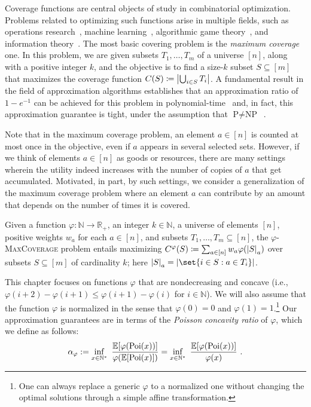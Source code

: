 Coverage functions are central objects of study in combinatorial optimization. Problems related to optimizing such functions arise in multiple fields, such as operations research~\cite{CFN77}, machine learning~\cite{FK14}, algorithmic game theory~\cite{DV15}, and information theory~\cite{BF18}. The most basic covering problem is the \emph{maximum coverage} one. In this problem, we are given subsets $T_1, \ldots, T_m$ of a universe $[n]$, along with a positive integer $k$, and the objective is to find a size-$k$ subset $S \subseteq [m]$ that maximizes the coverage function $C(S) \coloneqq  \abs{\bigcup_{i \in S} T_i}$. A fundamental result in the field of approximation algorithms establishes that an approximation ratio of $1-e^{-1}$ can be achieved for this problem in polynomial-time~\cite{Hochbaum96} and, in fact, this approximation guarantee is tight, under the assumption that $\textrm{P} \not= \textrm{NP}$~\cite{Feige98}.

Note that in the maximum coverage problem, an element $a \in [n]$ is counted at most once in the objective, even if $a$ appears in several selected sets. However, if we think of elements $a \in [n]$ as goods or resources, there are many settings wherein the utility indeed increases with the number of copies of $a$ that get accumulated. Motivated, in part, by such settings, we consider a generalization of the maximum coverage problem where an element $a$ can contribute by an amount that depends on the number of times it is covered. 

Given a function $\varphi: \mathbb{N} \rightarrow \mathbb{R}_+$, an integer $k \in \mathbb{N}$, a universe of elements $[n]$, positive weights $w_a$ for each $a \in [n]$, and  subsets $T_1,\ldots,T_m \subseteq [n]$, the $\varphi$-\textsc{MaxCoverage} problem entails maximizing $C^{\varphi}(S) \coloneqq \sum_{a \in [n]}w_a  \varphi(\abs{S}_a)$ over subsets $S \subseteq [m]$ of cardinality $k$; here $\abs{S}_a = \abs{\set{i \in S : a \in T_i}}$.

This chapter focuses on functions $\varphi$ that are nondecreasing and concave (i.e., $\varphi(i+2) - \varphi(i+1) \leq \varphi(i+1) - \varphi(i)$ for $i \in \mathbb{N}$). We will also assume that the function $\varphi$ is normalized in the sense that $\varphi(0) = 0$ and $\varphi(1) = 1$.\footnote{One can always replace a generic $\varphi$ to a normalized one without changing the optimal solutions through a simple affine transformation.} Our approximation guarantees are in terms of the \emph{Poisson concavity ratio} of $\varphi$, which we define as follows:
\begin{align}
\label{eq:def-alpha-varphi}
\alpha_{\varphi} := \inf_{x \in \mathbb{N}^*} \ \frac{\mathbb{E}[\varphi(\Poi(x))]}{\varphi(\mathbb{E}[\Poi(x)])} =  \inf_{x \in \mathbb{N}^*} \ \frac{\mathbb{E}[\varphi(\Poi(x))]}{\varphi(x)} \ .
\end{align} 

